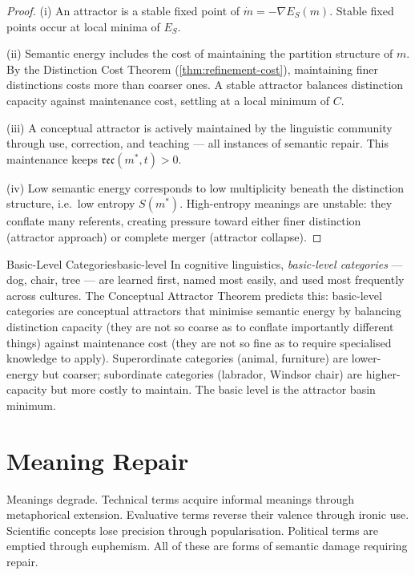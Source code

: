 \documentclass[12pt,twoside,openright]{book}
\newcommand{\csicon} {\marginpar{\tiny\color{DistBlue}\faCode}}
\newcommand{\bioicon}{\marginpar{\tiny\color{DistTeal}\faDna}}
\newcommand{\reco}{\mathfrak{rec}}
\begin{document}
\begin{proof}
  (i) An attractor is a stable fixed point of
  $\dot{m} = -\nabla E_S(m)$.
  Stable fixed points occur at local minima of $E_S$.

  (ii) Semantic energy includes the cost of maintaining
  the partition structure of $m$.
  By the Distinction Cost Theorem
  (\cref{thm:refinement-cost}), maintaining finer
  distinctions costs more than coarser ones.
  A stable attractor balances distinction capacity
  against maintenance cost, settling at a local
  minimum of $C$.

  (iii) A conceptual attractor is actively maintained
  by the linguistic community through use, correction,
  and teaching — all instances of semantic repair.
  This maintenance keeps $\reco(m^*, t) > 0$.

  (iv) Low semantic energy corresponds to low
  multiplicity beneath the distinction structure,
  i.e.\ low entropy $S(m^*)$.
  High-entropy meanings are unstable: they conflate
  many referents, creating pressure toward either
  finer distinction (attractor approach) or complete
  merger (attractor collapse).
\end{proof}

\begin{example}{Basic-Level Categories}{basic-level}
  \bioicon\csicon
  In cognitive linguistics, \emph{basic-level categories}
  — dog, chair, tree — are learned first, named most
  easily, and used most frequently across cultures.
  The Conceptual Attractor Theorem predicts this:
  basic-level categories are conceptual attractors that
  minimise semantic energy by balancing distinction
  capacity (they are not so coarse as to conflate
  importantly different things) against maintenance
  cost (they are not so fine as to require specialised
  knowledge to apply).
  Superordinate categories (animal, furniture) are
  lower-energy but coarser;
  subordinate categories (labrador, Windsor chair)
  are higher-capacity but more costly to maintain.
  The basic level is the attractor basin minimum.
\end{example}

\section{Meaning Repair}

Meanings degrade. Technical terms acquire informal
meanings through metaphorical extension. Evaluative
terms reverse their valence through ironic use.
Scientific concepts lose precision through
popularisation. Political terms are emptied through
euphemism. All of these are forms of semantic damage
requiring repair.
\end{document}
